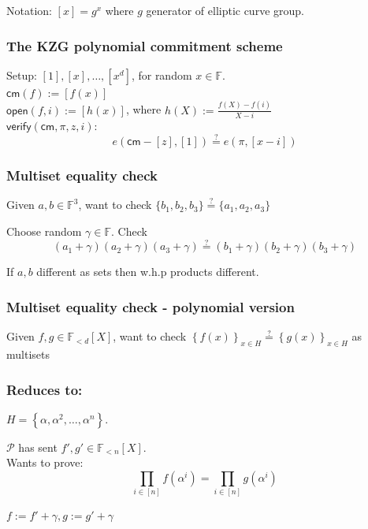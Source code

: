 \documentclass[shadesubsections,compress,14pt,mathserif]{beamer}
\newcommand{\F}{\ensuremath{\mathbb F}}
\newcommand{\set}[1]{\ensuremath{\left\{#1\right\}}}
\newcommand{\sett}[2]{\ensuremath{\left\{#1\right\}_{#2}}}
\newcommand{\enc}[1]{\ensuremath{\left[#1\right ]}}
\newcommand{\cm}{\ensuremath{\mathsf{cm}}}
\newcommand{\open}[1]{\ensuremath{\mathsf{open}(#1)}}
\newcommand{\verify}[1]{\ensuremath{\mathsf{verify}(#1)}}
\newcommand{\defeq}{\ensuremath{:=}}
\newcommand{\prv}{\ensuremath{\mathcal{P}}}
\newcommand{\polysofdeg}[1]{\F_{< #1}[X]}
\newcommand{\gen}{\alpha}
\begin{document}
\begin{frame}
Notation: $\enc{x}=g^x$ where $g$ generator of elliptic curve group.
\end{frame}


\begin{frame}
\frametitle{The KZG polynomial commitment scheme}
 Setup: $\enc{1},\enc{x},\ldots,\enc{x^d}$, for random $x\in \F$.\\ \pause
 \vspace{0.4in}
 $\cm(f)\defeq   \enc{f(x)}$\\ \pause
 \vspace{0.4in}
$\open{f,i}\defeq \enc{h(x)}$, where
 $h(X)\defeq \frac{f(X)-f(i)}{X-i}$\\ \pause
 \vspace{0.4in}
 $\verify{\cm,\pi,z,i}:$
\[e(\cm-\enc{z},\enc{1}) \stackrel{?}{=} e(\pi, \enc{x-i})\]
\end{frame}
\begin{frame}
\frametitle{Multiset equality check}
Given $a,b\in \F^3$, want to check $\{b_1,b_2,b_3\} \stackrel{?}{=} \{a_1,a_2,a_3\}$ \\ \pause
 \vspace{0.2in}

  
 Choose random $\gamma\in \F$. Check
  \[(a_1 + \gamma)(a_2+ \gamma)(a_3 + \gamma) \stackrel{?}{=} (b_1+\gamma)(b_2+\gamma)(b_3+\gamma)\]\pause

 \vspace{0.2in}
 If $a,b$ different as sets then w.h.p products different.\pause
 
\end{frame}



\begin{frame}
\frametitle{Multiset equality check - polynomial version}
Given $f,g\in \polysofdeg{d}$, want to check $\sett{f(x)}{x\in H} \stackrel{?}{=} \sett{g(x)}{x\in H}$ as multisets \\ 
 
\end{frame}
\begin{frame}
\frametitle{Reduces to:}   %
 $H=\set{\gen,\gen^2,\ldots,\gen^n}$.\\
 \vspace{0.2in}
 
 $\prv$ has sent $f',g'\in \polysofdeg{n}$.\\
 \vspace{0.2in}
 Wants to prove:
 \[\prod_{i\in [n]}  f(\gen^i) = \prod_{i\in [n]} g(\gen^i)\]

 $f\defeq f' +\gamma,g\defeq g'+\gamma$

\end{frame}
\end{document}
